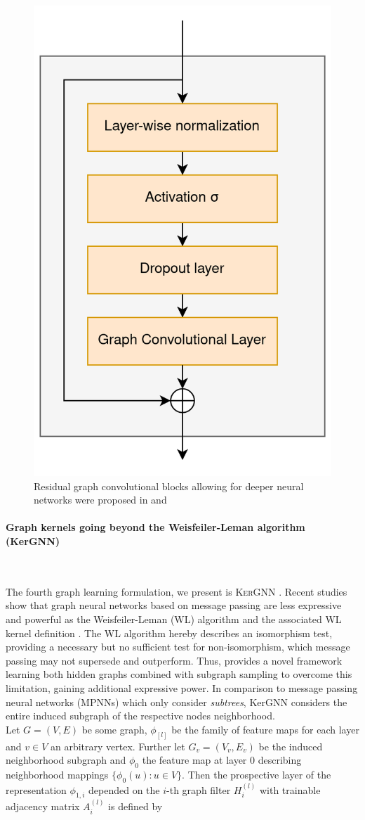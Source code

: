 \documentclass[]{article}
\renewcommand{\cite}{\citep}
\begin{document}
\begin{figure}
	\centering
	\includegraphics[width=.3\textwidth]{figures/GCN_residual_block.png}
	\caption[Residual graph convolutional blocks allowing for deeper neural networks]{Residual graph convolutional blocks allowing for deeper neural networks were proposed in \citet{DeepGCN2019} and \cite{GENConv2020}}
	\label{fig:ResGraphBlock}
\end{figure}

\paragraph{Graph kernels going beyond the Weisfeiler-Leman algorithm (KerGNN)}\mbox{}\\
\label{sec:KerGNN}

The fourth graph learning formulation, we present is \textsc{KerGNN} \cite{feng2022kergnns}. Recent studies \cite{xu2018powerful, morris2019weisfeiler} show that graph neural networks based on message passing are less expressive and powerful as the Weisfeiler-Leman (WL) algorithm \cite{leman1968reduction} and the associated WL kernel definition \cite{shervashidze2009efficient}. The WL algorithm hereby describes an isomorphism test, providing a necessary but no sufficient test for non-isomorphism, which message passing may not supersede and outperform. Thus, \citet{feng2022kergnns} provides a novel framework learning both hidden graphs combined with subgraph sampling to overcome this limitation, gaining additional expressive power. In comparison to message passing neural networks (MPNNs) which only consider \textit{subtrees}, KerGNN considers the entire induced subgraph of the respective nodes neighborhood. \\

Let $G=(V,E)$ be some graph, $\phi_{[l]}$ be the family of feature maps for each layer and $v\in V$ an arbitrary vertex. Further let $G_v=(V_v, E_v)$ be the induced neighborhood subgraph and $\phi_0$ the feature map at layer $0$ describing neighborhood mappings $\{ \phi_0(u):u\in V \}$. Then the prospective layer of the  representation $\phi_{1,i}$ depended on the $i$-th graph filter $H_i^{(l)}$ with trainable adjacency matrix $A_i^{(l)}$ is defined by
\end{document}
